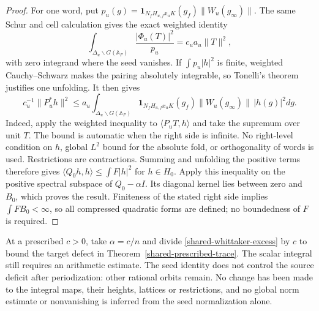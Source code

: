 \begin{proof}
For one word, put
\(p_u(g)=\mathbf1_{N_fH_{u,f}x_uK}(g_f)\|W_u(g_\infty)\|\).
The same Schur and cell calculation gives the exact weighted identity
\[
 \int_{\Delta_u\backslash G(\mathbb A_F)}
             \frac{|\Phi_u(T)|^2}{p_u}=c_ua_u\|T\|^2,
\]
with zero integrand where the seed vanishes. If \(\int p_u|h|^2\)
is finite, weighted Cauchy--Schwarz makes the pairing absolutely
integrable, so Tonelli's theorem justifies one unfolding. It then gives
\[
 c_u^{-1}\|P_u^*h\|^2
 \le a_u\int_{\Delta_u\backslash G(\mathbb A_F)}
     \mathbf1_{N_fH_{u,f}x_uK}(g_f)\|W_u(g_\infty)\|\,|h(g)|^2dg.
\]
Indeed, apply the weighted inequality to \(\langle P_uT,h\rangle\)
and take the supremum over unit \(T\). The bound is automatic when
the right side is infinite. No right-level condition on \(h\), global
\(L^2\) bound for the absolute fold, or orthogonality of words is used.
Restrictions are contractions. Summing and unfolding the positive
terms therefore gives \(\langle Q_0h,h\rangle\le\int F|h|^2\)
for \(h\in H_0\). Apply this inequality on the positive spectral
subspace of \(Q_0-\alpha I\). Its diagonal kernel lies between zero
and \(B_0\), which proves the result. Finiteness of the stated right
side implies \(\int FB_0<\infty\), so all compressed quadratic
forms are defined; no boundedness of \(F\) is required.
\end{proof}

At a prescribed \(c>0\), take \(\alpha=c/n\) and divide
\eqref{shared-whittaker-excess} by \(c\) to bound the target defect
in Theorem~\ref{shared-prescribed-trace}. The scalar integral still
requires an arithmetic estimate. The seed identity does not control
the source deficit after periodization: other rational orbits remain.
No change has been made to the integral maps, their heights, lattices
or restrictions, and no global norm estimate or nonvanishing is inferred
from the seed normalization alone.
